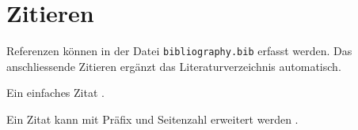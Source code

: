 \section{Zitieren}
Referenzen können in der Datei \texttt{bibliography.bib} erfasst werden. Das anschliessende Zitieren ergänzt das Literaturverzeichnis automatisch.

Ein einfaches Zitat \parencite{dirac}.

Ein Zitat kann mit Präfix und Seitenzahl erweitert werden \parencite[vgl.][16, 136, 156-157]{dirac}.